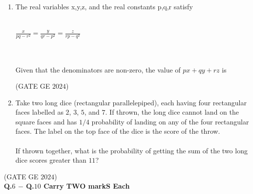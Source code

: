\documentclass[journal,12pt,onecolumn]{IEEEtran}
\theoremstyle{remark}
\begin{document}
\begin{enumerate}
\item The real variables x,y,z, and the real constants p,q,r satisfy \\
\\
\centerline{\large $\frac{x}{pq-r^{2}}=\frac{y}{qr-p^{2}}=\frac{z}{rp-q^{2}}$}
\\ \\Given that the denominators are non-zero, the value of $px+qy+rz$ is
\begin{enumerate}
\end{enumerate}
\hfill{(GATE GE $2024$)}
\bigskip
\item Take two long dice (rectangular parallelepiped), each having four rectangular faces
labelled as $2$, $3$, 
$5$, and $7$. If thrown, the long dice cannot land on the square faces and has $1/4$ probability of landing on any of the four rectangular faces.
The label on the top face of the dice is the score of the throw.\\
\\If thrown together, what is the probability of getting the sum of the two long dice scores greater than $11$?
\begin{enumerate}
\end{enumerate}
\end{enumerate}
\hfill{(GATE GE $2024$)}
\bigskip
\\
\textbf{Q.$6$ $-$ Q.$10$ Carry TWO markS Each}\\
\end{document}
